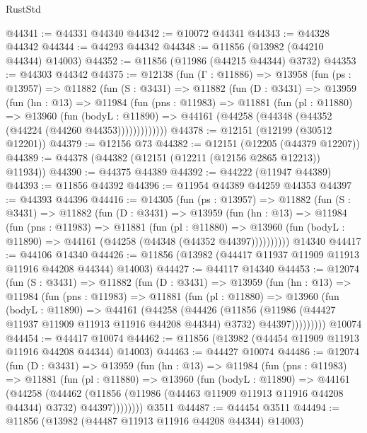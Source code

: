 \begin{lexlean}{RustStd}
\begin{coremodule}
@44341 := @44331 @44340
@44342 := @10072 @44341
@44343 := @44328 @44342
@44344 := @44293 @44342
@44348 := @11856 (@13982 (@44210 @44344) @14003)
@44352 := @11856 (@11986 (@44215 @44344) @3732)
@44353 := @44303 @44342
@44375 := @12138
    (fun (Γ : @11886) =>
    @13958
      (fun (ps : @13957) =>
      @11882
        (fun (S : @3431) =>
        @11882
          (fun (D : @3431) =>
          @13959
            (fun (hn : @13) =>
            @11984
              (fun (pns : @11983) =>
              @11881
                (fun (pl : @11880) =>
                @13960
                  (fun (bodyL : @11890) =>
                  @44161 (@44258 (@44348 (@44352 (@44224 (@44260 @44353)))))))))))))
@44378 := @12151 (@12199 (@30512 @12201))
@44379 := @12156 @73
@44382 := @12151 (@12205 (@44379 @12207))
@44389 := @44378 (@44382 (@12151 (@12211 (@12156 @2865 @12213)) @11934))
@44390 := @44375 @44389
@44392 := @44222 (@11947 @44389)
@44393 := @11856 @44392
@44396 := @11954 @44389 @44259 @44353
@44397 := @44393 @44396
@44416 := @14305
    (fun (ps : @13957) =>
    @11882
      (fun (S : @3431) =>
      @11882
        (fun (D : @3431) =>
        @13959
          (fun (hn : @13) =>
          @11984
            (fun (pns : @11983) =>
            @11881
              (fun (pl : @11880) =>
              @13960 (fun (bodyL : @11890) => @44161 (@44258 (@44348 (@44352 @44397))))))))))
    @14340
@44417 := @44106 @14340
@44426 := @11856 (@13982 (@44417 @11937 @11909 @11913 @11916 @44208 @44344) @14003)
@44427 := @44117 @14340
@44453 := @12074
    (fun (S : @3431) =>
    @11882
      (fun (D : @3431) =>
      @13959
        (fun (hn : @13) =>
        @11984
          (fun (pns : @11983) =>
          @11881
            (fun (pl : @11880) =>
            @13960
              (fun (bodyL : @11890) =>
              @44161
                (@44258
                  (@44426
                    (@11856
                      (@11986 (@44427 @11937 @11909 @11913 @11916 @44208 @44344) @3732)
                      @44397)))))))))
    @10074
@44454 := @44417 @10074
@44462 := @11856 (@13982 (@44454 @11909 @11913 @11916 @44208 @44344) @14003)
@44463 := @44427 @10074
@44486 := @12074
    (fun (D : @3431) =>
    @13959
      (fun (hn : @13) =>
      @11984
        (fun (pns : @11983) =>
        @11881
          (fun (pl : @11880) =>
          @13960
            (fun (bodyL : @11890) =>
            @44161
              (@44258
                (@44462
                  (@11856 (@11986 (@44463 @11909 @11913 @11916 @44208 @44344) @3732) @44397))))))))
    @3511
@44487 := @44454 @3511
@44494 := @11856 (@13982 (@44487 @11913 @11916 @44208 @44344) @14003)

\end{coremodule}
\end{lexlean}
